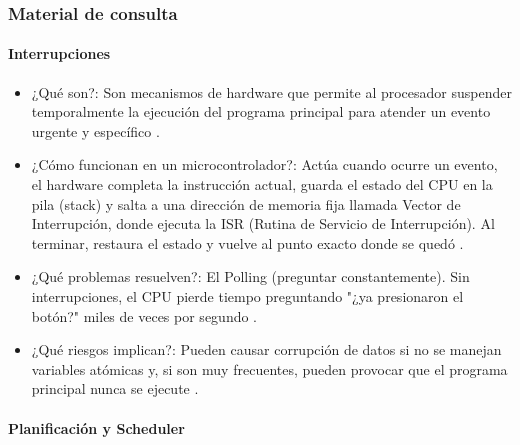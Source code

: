 \subsubsection{Material de consulta}

\paragraph{Interrupciones}

\begin{itemize}
    \item ¿Qué son?: Son mecanismos de hardware que permite al procesador suspender temporalmente la ejecución del programa principal para atender un evento urgente y específico \cite{sergio_2015_interrupciones}.
    
    \item ¿Cómo funcionan en un microcontrolador?: Actúa cuando ocurre un evento, el hardware completa la instrucción actual, guarda el estado del CPU en la pila (stack) y salta a una dirección de memoria fija llamada Vector de Interrupción, donde ejecuta la ISR (Rutina de Servicio de Interrupción). Al terminar, restaura el estado y vuelve al punto exacto donde se quedó \cite{sergio_2015_interrupciones}.
    
    \item ¿Qué problemas resuelven?: El Polling (preguntar constantemente). Sin interrupciones, el CPU pierde tiempo preguntando "¿ya presionaron el botón?" miles de veces por segundo \cite{sergio_2015_interrupciones}.

     \item ¿Qué riesgos implican?: Pueden causar corrupción de datos si no se manejan variables atómicas y, si son muy frecuentes, pueden provocar que el programa principal nunca se ejecute \cite{sergio_2015_interrupciones}.
     
\end{itemize}

\paragraph{Planificación y Scheduler}

